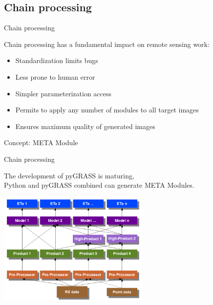 \documentclass[xcolor=dvipsnames,beamer]{beamer} %
\begin{document}
\subsection{Chain processing}
\begin{frame}[fragile]{Chain processing}

Chain processing has a fundamental impact on remote sensing work:\\

\begin{itemize}
 \item Standardization limits bugs
 \item Less prone to human error
 \item Simpler parameterization access
 \item Permits to apply any number of modules to all target images
 \item Ensures maximum quality of generated images
\end{itemize}

Concept: META Module

\end{frame}
\begin{frame}[fragile]{Chain processing}

The development of pyGRASS is maturing,\\
Python and pyGRASS combined can generate META Modules.
\newline\linebreak

\begin{center}
 \includegraphics[width=7.5cm]{chain0}
\end{center}

\end{frame}
\end{document}
